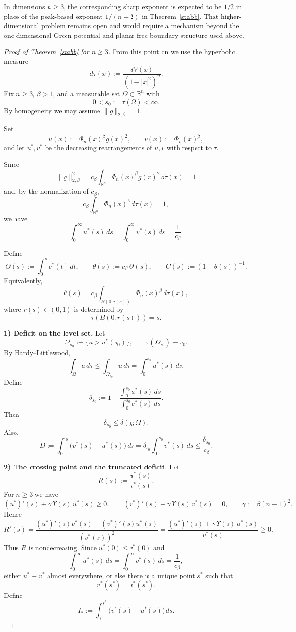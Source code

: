 
In dimensions $n\ge 3$, the corresponding sharp exponent is expected to be
$1/2$ in place of the peak-based exponent $1/(n+2)$ in Theorem~\ref{stabb}.
That higher-dimensional problem remains open and would require a mechanism
beyond the one-dimensional Green-potential and planar free-boundary structure
used above.


\begin{proof}[Proof of Theorem~\ref{stabb} for $n\ge 3$]
From this point on we use the hyperbolic measure
\[
d\tau(x):=\frac{dV(x)}{(1-|x|^2)^n}.
\]
Fix $n\ge 3$, $\beta>1$, and a measurable set $\Omega\subset\mathbb B^n$ with
\[
0<s_0:=\tau(\Omega)<\infty.
\]
By homogeneity we may assume $\|g\|_{2,\beta}=1$.

Set
\[
u(x):=\Phi_n(x)^\beta g(x)^2,
\qquad
v(x):=\Phi_n(x)^\beta,
\]
and let $u^*,v^*$ be the decreasing rearrangements of $u,v$ with respect to $\tau$.

Since
\[
\|g\|_{2,\beta}^2
=
c_\beta\int_{\mathbb B^n}\Phi_n(x)^\beta g(x)^2\,d\tau(x)=1
\]
and, by the normalization of $c_\beta$,
\[
c_\beta\int_{\mathbb B^n}\Phi_n(x)^\beta\,d\tau(x)=1,
\]
we have
\[
\int_0^\infty u^*(s)\,ds=\int_0^\infty v^*(s)\,ds=\frac1{c_\beta}.
\]

Define
\[
\Theta(s):=\int_0^s v^*(t)\,dt,
\qquad
\theta(s):=c_\beta\,\Theta(s),
\qquad
C(s):=(1-\theta(s))^{-1}.
\]
Equivalently,
\[
\theta(s)
=
c_\beta\int_{B(0,r(s))}\Phi_n(x)^\beta\,d\tau(x),
\]
where $r(s)\in(0,1)$ is determined by
\[
\tau(B(0,r(s)))=s.
\]

\smallskip\noindent
\textbf{1) Deficit on the level set.}
Let
\[
\Omega_{s_0}:=\{u>u^*(s_0)\},
\qquad
\tau(\Omega_{s_0})=s_0.
\]
By Hardy--Littlewood,
\[
\int_\Omega u\,d\tau\le \int_{\Omega_{s_0}}u\,d\tau=\int_0^{s_0}u^*(s)\,ds.
\]
Define
\[
\delta_{s_0}
:=
1-\frac{\displaystyle\int_0^{s_0}u^*(s)\,ds}
{\displaystyle\int_0^{s_0}v^*(s)\,ds}.
\]
Then
\[
\delta_{s_0}\le \delta(g;\Omega).
\]
Also,
\begin{equation}\label{eq:D-def-ng3}
D:=\int_0^{s_0}\bigl(v^*(s)-u^*(s)\bigr)\,ds
=
\delta_{s_0}\int_0^{s_0}v^*(s)\,ds
\le \frac{\delta_{s_0}}{c_\beta}.
\end{equation}

\smallskip\noindent
\textbf{2) The crossing point and the truncated deficit.}
Let
\[
R(s):=\frac{u^*(s)}{v^*(s)}.
\]
For $n\ge3$ we have
\[
(u^*)'(s)+\gamma\,\Upsilon(s)\,u^*(s)\ge0,
\qquad
(v^*)'(s)+\gamma\,\Upsilon(s)\,v^*(s)=0,
\qquad
\gamma:=\beta(n-1)^2.
\]
Hence
\[
R'(s)
=
\frac{(u^*)'(s)v^*(s)-(v^*)'(s)u^*(s)}{(v^*(s))^2}
=
\frac{(u^*)'(s)+\gamma\,\Upsilon(s)\,u^*(s)}{v^*(s)}
\ge0.
\]
Thus $R$ is nondecreasing. Since $u^*(0)\le v^*(0)$ and
\[
\int_0^\infty u^*(s)\,ds=\int_0^\infty v^*(s)\,ds=\frac1{c_\beta},
\]
either $u^*\equiv v^*$ almost everywhere, or else there is a unique point $s^*$ such that
\[
u^*(s^*)=v^*(s^*).
\]
Define
\[
I_*:=\int_0^{s^*}\bigl(v^*(s)-u^*(s)\bigr)\,ds.
\]


\end{proof}
